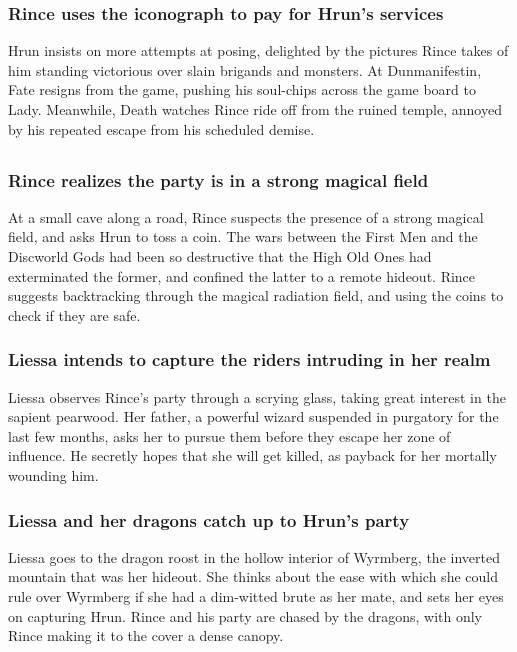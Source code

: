 \subsubsection{\Gls{Rince} uses the iconograph to pay for \Gls{Hrun}'s services}
\Gls{Hrun} insists on more attempts at posing, delighted by the pictures \Gls{Rince} takes of him
standing victorious over slain brigands and monsters. At Dunmanifestin, \Gls{Fate} resigns from the
game, pushing his soul-chips across the game board to \Gls{Lady}. Meanwhile, \Gls{Death} watches
\Gls{Rince} ride off from the ruined temple, annoyed by his repeated escape from his scheduled
demise.

\subsection{}
\subsubsection{\Gls{Rince} realizes the party is in a strong magical field}
At a small cave along a road, \Gls{Rince} suspects the presence of a strong magical field, and asks
\Gls{Hrun} to toss a coin. The wars between the First Men and the Discworld Gods had been so
destructive that the High Old Ones had exterminated the former, and confined the latter to a remote
hideout. \Gls{Rince} suggests backtracking through the magical radiation field, and using the coins
to check if they are safe.

\subsubsection{\Gls{Liessa} intends to capture the riders intruding in her realm}
\Gls{Liessa} observes \Gls{Rince}'s party through a scrying glass, taking great interest in the
sapient pearwood. Her father, a powerful wizard suspended in purgatory for the last few months, asks
her to pursue them before they escape her zone of influence. He secretly hopes that she will get
killed, as payback for her mortally wounding him.

\subsubsection{\Gls{Liessa} and her dragons catch up to \Gls{Hrun}'s party}
\Gls{Liessa} goes to the dragon roost in the hollow interior of Wyrmberg, the inverted mountain that
was her hideout. She thinks about the ease with which she could rule over Wyrmberg if she had a
dim-witted brute as her mate, and sets her eyes on capturing \Gls{Hrun}. \Gls{Rince} and his party
are chased by the dragons, with only \Gls{Rince} making it to the cover a dense canopy.

